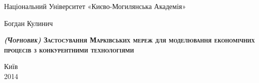 \begin{titlepage}
\newpage

\begin{center}
Національний Університет «Києво-Могилянська Академія» \\
\end{center}

\vspace{8em}

\begin{center}
Богдан Кулинич
\end{center}

\vspace{2em}

\begin{center}
\textsc{\textbf{\textit{(Чорновик)} Застосування Марківських мереж для моделювання економічних процесів з конкурентними технологіями}}
\end{center}

\vspace{6em}

\vspace{\fill}

\begin{center}
Київ \\2014
\end{center}

\end{titlepage}